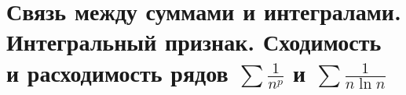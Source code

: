 \section{Связь между суммами и интегралами. Интегральный признак. Сходимость и расходимость рядов $\sum \frac{1}{n^p}$ и $\sum \frac{1}{n \ln n}$}
